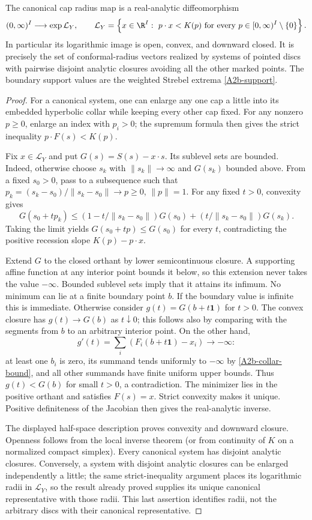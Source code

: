 \begin{theorem}\label{A2b-image}
The canonical cap radius map is a real-analytic diffeomorphism
\[
 (0,\infty)^I\longrightarrow\exp\mathcal L_Y,
 \qquad
 \mathcal L_Y=
 \left\{x\in\R^I:\ p\cdot x<K(p)
       \text{ for every }p\in[0,\infty)^I\setminus\{0\}\right\}.
\]
In particular its logarithmic image is open, convex, and downward closed.
It is precisely the set of conformal-radius vectors realized by systems
of pointed discs with pairwise disjoint analytic closures avoiding all
the other marked points. The boundary
support values are the weighted Strebel extrema \eqref{A2b-support}.
\end{theorem}
\begin{proof}
For a canonical system, one can enlarge any one cap a little into its
embedded hyperbolic collar while keeping every other cap fixed. For
any nonzero $p\geq0$, enlarge an index with $p_i>0$; the supremum formula
then gives the strict inequality $p\cdot F(s)<K(p)$.

Fix $x\in\mathcal L_Y$ and put $G(s)=S(s)-x\cdot s$.
Its sublevel sets are bounded. Indeed, otherwise choose $s_k$ with
$\|s_k\|\to\infty$ and $G(s_k)$ bounded above. From a fixed $s_0>0$,
pass to a subsequence such that
$p_k=(s_k-s_0)/\|s_k-s_0\|\to p\geq0$, $\|p\|=1$.
For any fixed $t>0$, convexity gives
\[
 G(s_0+tp_k)\leq
 (1-t/\|s_k-s_0\|)G(s_0)
 +(t/\|s_k-s_0\|)G(s_k).
\]
Taking the limit yields $G(s_0+tp)\leq G(s_0)$ for every $t$,
contradicting the positive recession slope $K(p)-p\cdot x$.

Extend $G$ to the closed orthant by lower semicontinuous closure.
A supporting affine function at any interior point bounds it below,
so this extension never takes the value $-\infty$. Bounded sublevel
sets imply that it attains its infimum. No minimum can lie at a finite
boundary point $b$. If the boundary value is infinite this is immediate.
Otherwise consider $g(t)=G(b+t\mathbf1)$ for $t>0$.
The convex closure has $g(t)\to G(b)$ as $t\downarrow0$; this follows
also by comparing with the segments from $b$ to an arbitrary interior
point. On the other hand,
\[
 g'(t)=\sum_i(F_i(b+t\mathbf1)-x_i)\longrightarrow-\infty:
\]
at least one $b_i$ is zero, its summand tends uniformly to $-\infty$
by \eqref{A2b-collar-bound}, and all other summands have finite uniform
upper bounds. Thus $g(t)<G(b)$ for small $t>0$, a contradiction.
The minimizer lies in the positive orthant and satisfies $F(s)=x$.
Strict convexity makes it unique. Positive definiteness of the Jacobian
then gives the real-analytic inverse.

The displayed half-space description proves convexity and downward
closure. Openness follows from the local inverse theorem (or from
continuity of $K$ on a normalized compact simplex). Every canonical
system has disjoint analytic closures. Conversely, a system with
disjoint analytic closures can be enlarged independently a little;
the same strict-inequality argument places its logarithmic radii in
$\mathcal L_Y$, so the result already proved supplies its unique
canonical representative with those radii. This last assertion
identifies radii, not the arbitrary discs with their canonical
representative.
\end{proof}

